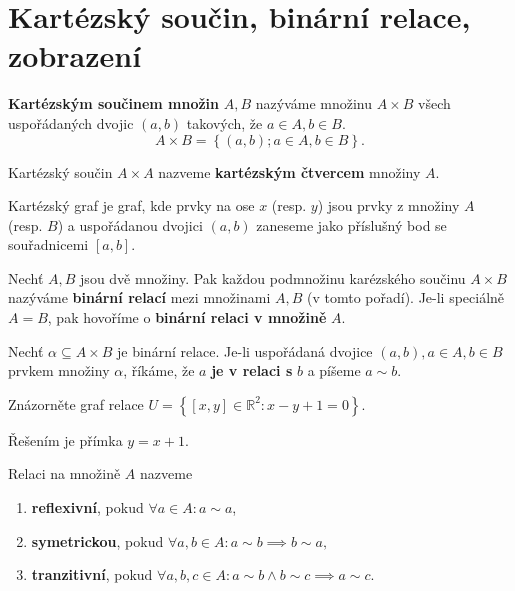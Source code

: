 \section{Kartézský součin, binární relace, zobrazení}
\begin{definition}
  \textbf{Kartézským součinem množin} $A,B$ nazýváme množinu $A\times B$ všech uspořádaných dvojic $(a,b)$ takových, že $a\in A,b\in B$.
  \[
    A \times B = \left \{ (a,b); a\in A,b\in B \right \}.
  \]
\end{definition}

\begin{pozn}
  Kartézský součin $A\times A$ nazveme \textbf{kartézským čtvercem} množiny $A$.
\end{pozn}

\begin{pozn}
  Kartézský graf je graf, kde prvky na ose $x$ (resp. $y$) jsou prvky z množiny $A$ (resp. $B$) a uspořádanou dvojici $(a,b)$ zaneseme jako příslušný bod se souřadnicemi $[a,b].$
\end{pozn}

\begin{definition}
  Nechť $A,B$ jsou dvě množiny. Pak každou podmnožinu karézského součinu $A\times B$ nazýváme \textbf{binární relací} mezi množinami $A,B$
  (v tomto pořadí). Je-li speciálně $A=B$, pak hovoříme o \textbf{binární relaci v množině} $A$.
\end{definition}

\begin{definition}
Nechť $\alpha\subseteq A\times B$ je binární relace. Je-li uspořádaná dvojice $(a,b), a \in A, b \in B$ prvkem množiny $\alpha$,
říkáme, že $a$ \textbf{je v relaci s} $b$ a píšeme $a \sim b$.
\end{definition}

\begin{priklad}
Znázorněte graf relace $U=\left \{ \left [ x,y \right ]\in \mathbb R^2: x-y+1=0  \right \}. $
\end{priklad}

\begin{reseni}
Řešením je přímka $y=x+1.$
\end{reseni}

\begin{definition}
  Relaci na množině $A$ nazveme
  \begin{enumerate}[$i.$]
    \item \textbf{reflexivní}, pokud $\forall a\in A: a\sim a$,
    \item \textbf{symetrickou}, pokud $\forall a,b \in A: a\sim b \implies b\sim a,$
    \item \textbf{tranzitivní}, pokud $\forall a,b,c\in A: a\sim b \land b\sim c \implies a\sim c.$
  \end{enumerate}
\end{definition}

